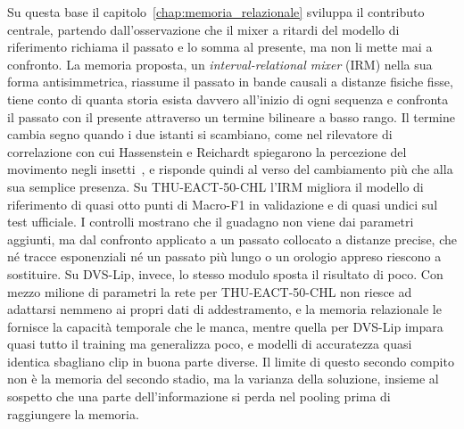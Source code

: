 Su questa base il capitolo~\ref{chap:memoria_relazionale} sviluppa il contributo centrale, partendo dall'osservazione che il mixer a ritardi del modello di riferimento richiama il passato e lo somma al presente, ma non li mette mai a confronto. La memoria proposta, un \emph{interval-relational mixer} (IRM) nella sua forma antisimmetrica, riassume il passato in bande causali a distanze fisiche fisse, tiene conto di quanta storia esista davvero all'inizio di ogni sequenza e confronta il passato con il presente attraverso un termine bilineare a basso rango. Il termine cambia segno quando i due istanti si scambiano, come nel rilevatore di correlazione con cui Hassenstein e Reichardt spiegarono la percezione del movimento negli insetti~\cite{hassenstein1956systemtheoretische}, e risponde quindi al verso del cambiamento più che alla sua semplice presenza. Su THU-EACT-50-CHL l'IRM migliora il modello di riferimento di quasi otto punti di Macro-F1 in validazione e di quasi undici sul test ufficiale. I controlli mostrano che il guadagno non viene dai parametri aggiunti, ma dal confronto applicato a un passato collocato a distanze precise, che né tracce esponenziali né un passato più lungo o un orologio appreso riescono a sostituire. Su DVS-Lip, invece, lo stesso modulo sposta il risultato di poco. Con mezzo milione di parametri la rete per THU-EACT-50-CHL non riesce ad adattarsi nemmeno ai propri dati di addestramento, e la memoria relazionale le fornisce la capacità temporale che le manca, mentre quella per DVS-Lip impara quasi tutto il training ma generalizza poco, e modelli di accuratezza quasi identica sbagliano clip in buona parte diverse. Il limite di questo secondo compito non è la memoria del secondo stadio, ma la varianza della soluzione, insieme al sospetto che una parte dell'informazione si perda nel pooling prima di raggiungere la memoria.

